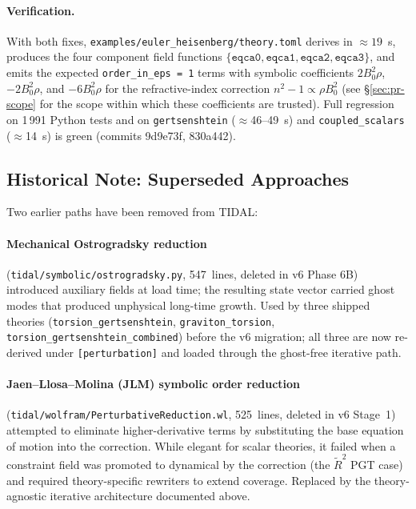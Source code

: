 \paragraph{Verification.} With both fixes, \verb|examples/euler_heisenberg/theory.toml| derives in $\approx 19$~s, produces the four component field functions $\{\texttt{eqca0}, \texttt{eqca1}, \texttt{eqca2}, \texttt{eqca3}\}$, and emits the expected \verb|order_in_eps = 1| terms with symbolic coefficients $2 B_0^2 \rho$, $-2 B_0^2 \rho$, and $-6 B_0^2 \rho$ for the refractive-index correction $n^2 - 1 \propto \rho B_0^2$ (see \S\ref{sec:pr-scope} for the scope within which these coefficients are trusted). Full regression on 1\,991 Python tests and on \verb|gertsenshtein| ($\approx$46--49~s) and \verb|coupled_scalars| ($\approx$14~s) is green (commits 9d9e73f, 830a442).

\subsection{Historical Note: Superseded Approaches}
\label{sec:pr-superseded}

Two earlier paths have been removed from TIDAL:

\paragraph{Mechanical Ostrogradsky reduction} (\verb|tidal/symbolic/ostrogradsky.py|, 547~lines, deleted in v6 Phase 6B) introduced auxiliary fields at load time; the resulting state vector carried ghost modes that produced unphysical long-time growth. Used by three shipped theories (\verb|torsion_gertsenshtein|, \verb|graviton_torsion|, \verb|torsion_gertsenshtein_combined|) before the v6 migration; all three are now re-derived under \verb|[perturbation]| and loaded through the ghost-free iterative path.

\paragraph{Jaen--Llosa--Molina (JLM) symbolic order reduction} (\verb|tidal/wolfram/PerturbativeReduction.wl|, 525~lines, deleted in v6 Stage~1) attempted to eliminate higher-derivative terms by substituting the base equation of motion into the correction. While elegant for scalar theories, it failed when a constraint field was promoted to dynamical by the correction (the $\tilde{R}^2$ PGT case) and required theory-specific rewriters to extend coverage. Replaced by the theory-agnostic iterative architecture documented above.

